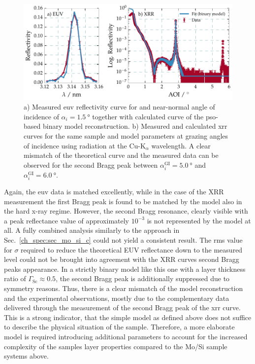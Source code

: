 \begin{figure}[htbp]
  \centering
  \includegraphics[width=\textwidth]{img/CrSc_binary_model_EUV_vs_XRR}
  \caption{a) Measured \gls{euv} reflectivity curve for and near-normal angle of incidence of $\alpha_i=\SI{1.5}{\degree}$ together with calculated curve of the \gls{pso}-based binary model reconstruction. b) Measured and calculated \gls{xrr} curves for the same sample and model parameters at grazing angles of incidence using radiation at the Cu-K$_\alpha$ wavelength. A clear mismatch of the theoretical curve and the measured data can be observed for the second Bragg peak between $\alpha_i^\text{GI} = \SI{5.0}{\degree}$ and $\alpha_i^\text{GI} = \SI{6.0}{\degree}$.}
  \label{ch_spec:fig_CrSc_binary_model_EUV_vs_XRR}
\end{figure}

Again, the \gls{euv} data is matched excellently, while in the case of the XRR measurement the first Bragg peak is found to be matched by the model also in the hard x-ray regime. However, the second Bragg resonance, clearly visible with a peak reflectance value of approximately $10^{-3}$ is not represented by the model at all. A fully
combined analysis similarly to the approach in Sec.~\ref{ch_spec:sec_mo_si_c} could not yield a consistent result. The \gls{rms} value for $\sigma$ required to reduce the theoretical EUV reflectance down to the measured 
level could not be brought into agreement with the XRR curves second Bragg peaks appearance. In a strictly binary model like this one with a layer thickness ratio of 
$\Gamma_\text{Sc}\approx 0.5$, the second Bragg peak is additionally suppressed 
due to symmetry reasons. Thus, there is a clear mismatch of the model reconstruction and the experimental observations, mostly due to the complementary data delivered through the measurement of the second Bragg peak of the \gls{xrr} curve. This is a strong indicator, that the simple model as defined above does not suffice to describe the physical situation of the sample. Therefore, a more elaborate model is required introducing additional parameters to account for the increased complexity of the samples layer properties compared to the Mo/Si sample systems above.

